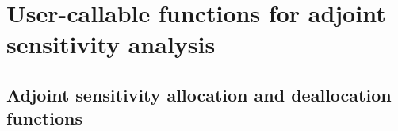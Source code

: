 \section{User-callable functions for adjoint sensitivity analysis}

\subsection{Adjoint sensitivity allocation and deallocation functions}
\label{sss:cvadjinit}

